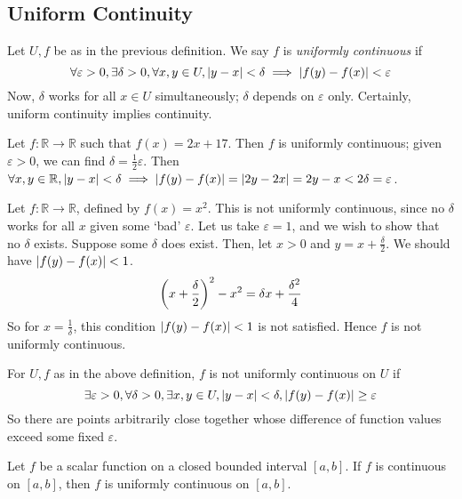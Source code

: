 \subsection{Uniform Continuity}
\begin{definition}
	Let \( U, f \) be as in the previous definition.
	We say \( f \) is \textit{uniformly continuous} if
	\[
		\forall \varepsilon > 0, \exists \delta > 0, \forall x, y \in U, \abs{y-x} < \delta \implies \abs{f(y) - f(x)} < \varepsilon
	\]
	Now, \( \delta \) works for all \( x \in U \) simultaneously; \( \delta \) depends on \( \varepsilon \) only.
	Certainly, uniform continuity implies continuity.
\end{definition}
\begin{example}
	Let \( f \colon \mathbb R \to \mathbb R \) such that \( f(x) = 2x + 17 \).
	Then \( f \) is uniformly continuous; given \( \varepsilon > 0 \), we can find \( \delta = \frac{1}{2} \varepsilon \).
	Then \( \forall x, y \in \mathbb R, \abs{y-x} < \delta \implies \abs{f(y)-f(x)} = \abs{2y-2x} = 2{y-x} < 2 \delta = \varepsilon \).
\end{example}
\begin{example}
	Let \( f \colon \mathbb R \to \mathbb R \), defined by \( f(x) = x^2 \).
	This is not uniformly continuous, since no \( \delta \) works for all \( x \) given some `bad' \( \varepsilon \).
	Let us take \( \varepsilon = 1 \), and we wish to show that no \( \delta \) exists.
	Suppose some \( \delta \) does exist.
	Then, let \( x > 0 \) and \( y = x + \frac{\delta}{2} \).
	We should have \( \abs{f(y) - f(x)} < 1 \).
	\[
		\qty(x + \frac{\delta}{2})^2 - x^2 = \delta x + \frac{\delta^2}{4}
	\]
	So for \( x = \frac{1}{\delta} \), this condition \( \abs{f(y) - f(x)} < 1 \) is not satisfied.
	Hence \( f \) is not uniformly continuous.
\end{example}
\begin{note}
	For \( U, f \) as in the above definition, \( f \) is not uniformly continuous on \( U \) if
	\[
		\exists \varepsilon > 0, \forall \delta > 0, \exists x, y \in U, \abs{y-x} < \delta, \abs{f(y) - f(x)} \geq \varepsilon
	\]
	So there are points arbitrarily close together whose difference of function values exceed some fixed \( \varepsilon \).
\end{note}
\begin{theorem}
	Let \( f \) be a scalar function on a closed bounded interval \( [a,b] \).
	If \( f \) is continuous on \( [a,b] \), then \( f \) is uniformly continuous on \( [a,b] \).
\end{theorem}
